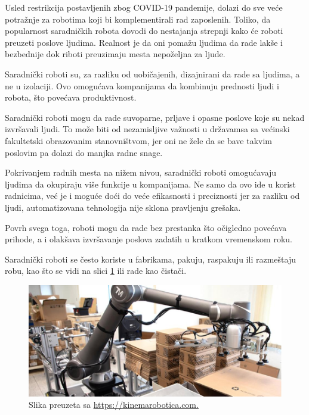 \documentclass{article}
\begin{document}
	Usled restrikcija postavljenih zbog COVID-19 pandemije, dolazi do sve veće potražnje za robotima koji bi komplementirali rad zaposlenih. Toliko, da popularnost saradničkih robota dovodi do nestajanja strepnji kako će roboti preuzeti poslove ljudima. Realnost je da oni pomažu ljudima da rade lakše i bezbednije dok riboti preuzimaju mesta nepoželjna za ljude.
	
	Saradnički roboti su, za razliku od uobičajenih, dizajnirani da rade sa ljudima, a ne u izolaciji. Ovo omogućava kompanijama da kombinuju prednosti ljudi i robota, što povećava produktivnost. \cite{robotics2022}
	
	Saradnički roboti mogu da rade suvoparne, prljave i opasne poslove koje su nekad izvršavali ljudi. To može biti od nezamisljive važnosti u državamsa sa većinski fakultetski obrazovanim stanovništvom, jer oni ne žele da se bave takvim poslovim pa dolazi do manjka radne snage.
	
	Pokrivanjem radnih mesta na nižem nivou, saradnički roboti omogućavaju ljudima da okupiraju više funkcije u kompanijama. Ne samo da ovo ide u korist radnicima, već je i moguće doći do veće efikasnosti i preciznosti jer za razliku od ljudi, automatizovana tehnologija nije sklona pravljenju grešaka.
	
	Povrh svega toga, roboti mogu da rade bez prestanka što očigledno povećava prihode, a i olakšava izvršavanje poslova zadatih u kratkom vremenskom roku. \cite{cobots}
	
	Saradnički roboti se često koriste u fabrikama, pakuju, raspakuju ili razmeštaju robu, kao što se vidi na slici \ref{cobot} ili rade kao čistači. \cite{robots2022}
	
	\begin{figure}
		\centering
		\includegraphics[scale=0.41]{Cobot.jpg}
		\caption{Slika preuzeta sa \url{https://kinemarobotica.com.}}
		\label{cobot}
	\end{figure}
	
\end{document}
